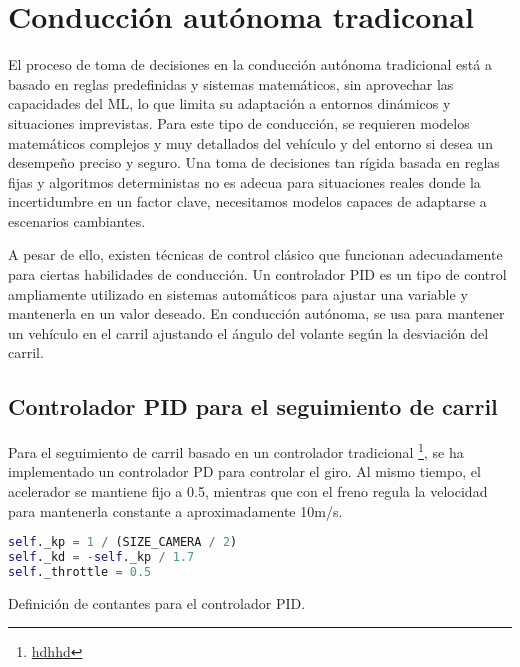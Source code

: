 \section{Conducción autónoma tradiconal}

El proceso de toma de decisiones en la conducción autónoma tradicional está a basado en reglas predefinidas y sistemas matemáticos, sin aprovechar las capacidades del \ac{ML}, lo que limita su adaptación a entornos dinámicos y situaciones imprevistas. Para este tipo de conducción, se requieren modelos matemáticos complejos y muy detallados del vehículo y del entorno si desea un desempeño preciso y seguro. Una toma de decisiones tan rígida basada en reglas fijas y algoritmos deterministas no es adecua para situaciones reales donde la incertidumbre en un factor clave, necesitamos modelos capaces de adaptarse a escenarios cambiantes. 

A pesar de ello, existen técnicas de control clásico que funcionan adecuadamente para ciertas habilidades de conducción. Un controlador \ac{PID} es un tipo de control ampliamente utilizado en sistemas automáticos para ajustar una variable y mantenerla en un valor deseado. En conducción autónoma, se usa para mantener un vehículo en el carril ajustando el ángulo del volante según la desviación del carril.

\subsection{Controlador \ac{PID} para el seguimiento de carril}
Para el seguimiento de carril basado en un controlador tradicional \footnote{\url{hdhhd}}, se ha implementado un controlador PD para controlar el giro. Al mismo tiempo, el acelerador se mantiene fijo a 0.5, mientras que con el freno regula la velocidad para mantenerla constante a aproximadamente 10m/s.
\begin{code}[h]
\begin{lstlisting}[language=Python]
self._kp = 1 / (SIZE_CAMERA / 2)
self._kd = -self._kp / 1.7
self._throttle = 0.5
\end{lstlisting}
\caption[Definición de contantes para el controlador \ac{PID}]{Definición de contantes para el controlador \ac{PID}.}
\label{cod:const_pid}
\end{code}

